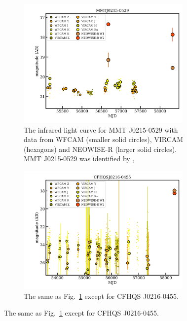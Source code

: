 \documentclass[usenatbib]{mnras}
\begin{document}
\begin{figure}
  \begin{subfigure}{}
    \centering
    \includegraphics[width=8.5cm]{figures/MMTJ0215-0529LC_20190613.png}
    \caption{The infrared light curve for MMT J0215-0529 with data from 
      WFCAM (smaller solid circles), VIRCAM (hexagons) and NEOWISE-R (larger solid circles).
MMT  J0215-0529 was identified by \citet{McGreer2018}, 
}
    \label{fig:MMTJ0215-0529}
  \end{subfigure} 
  \begin{subfigure}{}
    \centering
    \includegraphics[width=8.5cm]{figures/CFHQSJ0216-0455LC_20190613.png}
    \caption{The same as Fig.~\ref{fig:MMTJ0215-0529} except for CFHQS J0216-0455.}
    \label{fig:CFHQSJ0216-0455}
  \end{subfigure}
\end{figure}
\end{document}
